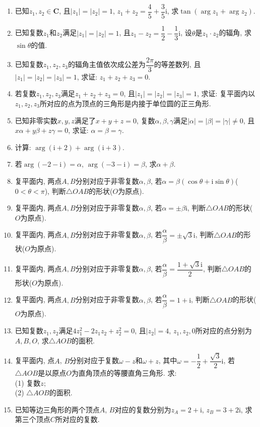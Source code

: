 \documentclass[10pt,a4paper]{article}
\begin{document}
\begin{enumerate}[1.]
\item 已知$z_1,z_2\in \mathbf{C}$, 且$|z_1|=|z_2|=1$, $z_1+z_2=\dfrac 45+\dfrac 35\mathrm{i}$, 求$\tan (\arg z_1+\arg z_2)$.
\item 已知复数$z_1$和$z_2$满足$|z_1|=|z_2|=1$, 且$z_1-z_2=\dfrac 12-\dfrac 13\mathrm{i}$, 设$\theta$是$z_1\cdot z_2$的辐角, 求$\sin \theta$的值.
\item 已知复数$z_1,z_2,z_3$的辐角主值依次成公差为$\dfrac{2\pi }3$的等差数列, 且$|z_1|=|z_2|=|z_3|=1$, 求证: $z_1+z_2+z_3=0$.
\item 若复数$z_1,z_2,z_3$满足$z_1+z_2+z_3=0$, 且$|z_1|=|z_2|=|z_3|=1$, 求证: 复平面内以$z_1,z_2,z_3$所对应的点为顶点的三角形是内接于单位圆的正三角形.
\item 已知非零实数$x,y,z$满足了$x+y+z=0$, 复数$\alpha ,\beta ,\gamma$满足$|\alpha|=|\beta|=|\gamma|\ne 0$, 且$x\alpha +y\beta +z\gamma =0$, 求证: $\alpha =\beta =\gamma$.
\item 计算: $\arg (\mathrm{i}+2)+\arg (\mathrm{i}+3)$.
\item 若$\arg (-2-\mathrm{i})=\alpha$, $\arg (-3-\mathrm{i})=\beta$, 求$\alpha +\beta$.
\item 复平面内, 两点$A,B$分别对应于非零复数$\alpha ,\beta$, 若$\alpha =\beta (\cos \theta +\mathrm{i}\sin \theta)$($0<\theta <\pi$), 判断$\triangle OAB$的形状($O$为原点).
\item 复平面内, 两点$A,B$分别对应于非零复数$\alpha ,\beta$, 若$\alpha =\pm \beta \mathrm{i}$, 判断$\triangle OAB$的形状($O$为原点).
\item 复平面内, 两点$A,B$分别对应于非零复数$\alpha ,\beta$, 若$\dfrac{\alpha }{\beta }=\pm \sqrt 3\mathrm{i}$, 判断$\triangle OAB$的形状($O$为原点).
\item 复平面内, 两点$A,B$分别对应于非零复数$\alpha ,\beta$, 若$\dfrac{\alpha }{\beta }=\dfrac{1+\sqrt 3\mathrm{i}}2$, 判断$\triangle OAB$的形状($O$为原点).
\item 复平面内, 两点$A,B$分别对应于非零复数$\alpha ,\beta$, 若$\dfrac{\alpha }{\beta }=1+\mathrm{i}$, 判断$\triangle OAB$的形状($O$为原点).
\item 已知复数$z_1,z_2$满足$4z_1^2-2z_1z_2+z_2^2=0$, 且$|z_2|=4$, $z_1,z_2,0$所对应的点分别为$A,B,O$, 求$\triangle AOB$的面积.
\item 复平面内, 点$A$, $B$分别对应于复数$\omega -z$和$\omega +z$, 其中$\omega =-\dfrac 12+\dfrac{\sqrt 3}2\mathrm{i}$, 若$\triangle AOB$是以原点$O$为直角顶点的等腰直角三角形. 求:\\
(1) 复数$z$;\\
(2) $\triangle AOB$的面积.
\item 已知等边三角形的两个顶点$A$, $B$对应的复数分别为$z_A=2+\mathrm{i}$, $z_B=3+2\mathrm{i}$, 求第三个顶点$C$所对应的复数.

\end{enumerate}
\end{document}
